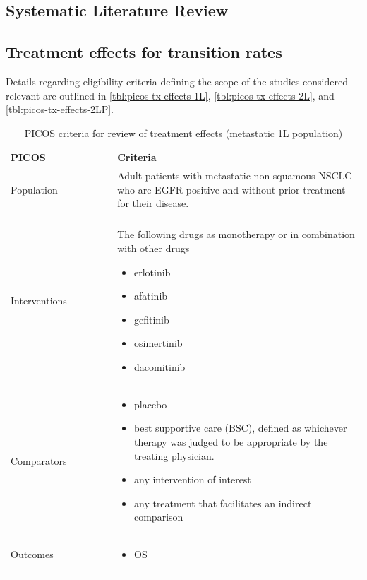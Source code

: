 \documentclass[11pt,final,fleqn]{article}\usepackage[]{graphicx}\usepackage[]{color}
\theoremstyle{plain}
\begin{document}
\begin{appendices}
\section{Systematic Literature Review}\label{app:slr}

\subsection{Treatment effects for transition rates}
Details regarding eligibility criteria defining the scope of the studies considered relevant are outlined in \autoref{tbl:picos-tx-effects-1L}, \autoref{tbl:picos-tx-effects-2L}, and \autoref{tbl:picos-tx-effects-2LP}. 


\begin{table}[!ht]
\begin{center}
\begin{threeparttable}
\caption{PICOS criteria for review of treatment effects (metastatic 1L population)} \label{tbl:picos-tx-effects-1L}
\begin{tabular}{p{0.3\linewidth}p{0.7\linewidth}}
\hline
\multicolumn{1}{l}{PICOS} &  \multicolumn{1}{l}{Criteria}\\
\hline
Population & Adult patients with metastatic non-squamous NSCLC who are EGFR positive and without prior treatment for their disease.\\
&\\
Interventions & The following drugs as monotherapy or in combination with other drugs 
\begin{itemize}
\item erlotinib
\item afatinib
\item gefitinib
\item osimertinib
\item dacomitinib
\end{itemize} \\
Comparators & 
\begin{itemize}
\item placebo
\item best supportive care (BSC), defined as whichever therapy was judged to be appropriate by the treating physician.
\item any intervention of interest
\item any treatment that facilitates an indirect comparison
\end{itemize} \\
Outcomes & 
\begin{itemize}
\item OS

\end{itemize}
\end{tabular}
\end{threeparttable}
\end{center}
\end{table}
\end{appendices}
\end{document}

